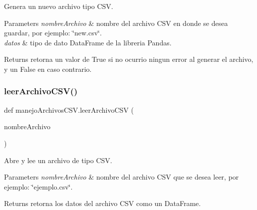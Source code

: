 Genera un nuevo archivo tipo C\+SV. 


\begin{DoxyParams}{Parameters}
{\em nombre\+Archivo} & nombre del archivo C\+SV en donde se desea guardar, por ejemplo\+: \char`\"{}new.\+csv\char`\"{}. \\
\hline
{\em datos} & tipo de dato Data\+Frame de la libreria Pandas. \\
\hline
\end{DoxyParams}
\begin{DoxyReturn}{Returns}
retorna un valor de True si no ocurrio ningun error al generar el archivo, y un False en caso contrario. 
\end{DoxyReturn}
\mbox{\label{namespacemanejo_archivos_c_s_v_af84ef6e5a0591162a0b781c11145845e}} 
\subsubsection{\texorpdfstring{leer\+Archivo\+C\+S\+V()}{leerArchivoCSV()}}
{\footnotesize\ttfamily def manejo\+Archivos\+C\+S\+V.\+leer\+Archivo\+C\+SV (\begin{DoxyParamCaption}\item[{}]{nombre\+Archivo }\end{DoxyParamCaption})}



Abre y lee un archivo de tipo C\+SV. 


\begin{DoxyParams}{Parameters}
{\em nombre\+Archivo} & nombre del archivo C\+SV que se desea leer, por ejemplo\+: \char`\"{}ejemplo.\+csv\char`\"{}. \\
\hline
\end{DoxyParams}
\begin{DoxyReturn}{Returns}
retorna los datos del archivo C\+SV como un Data\+Frame. 
\end{DoxyReturn}
